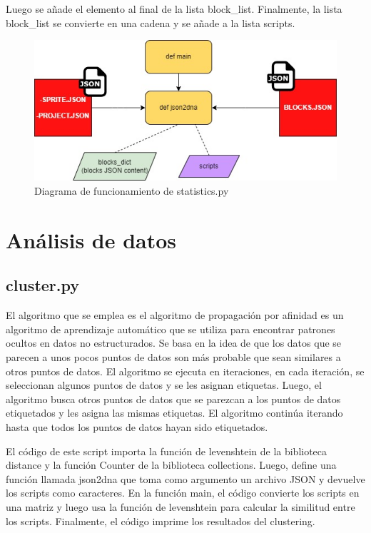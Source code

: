\documentclass[a4paper, 12pt]{book}
\begin{document}
Luego se añade el elemento al final de la lista block\_list. Finalmente, la lista block\_list se convierte en una cadena y se añade a la lista scripts. 

\begin{figure}[!htb]
  \centering
  \includegraphics[width=13cm, keepaspectratio]{img/flow_statistics.jpg}
  \caption{Diagrama de funcionamiento de statistics.py}
  \label{fig:flow_statistics}
\end{figure}

\section{Análisis de datos} 
\label{sec:extracciondatos}

\subsection{cluster.py}

El algoritmo que se emplea es el algoritmo de propagación por afinidad es un algoritmo de aprendizaje automático que se utiliza para encontrar patrones ocultos en datos no estructurados. Se basa en la idea de que los datos que se parecen a unos pocos puntos de datos son más probable que sean similares a otros puntos de datos. El algoritmo se ejecuta en iteraciones, en cada iteración, se seleccionan algunos puntos de datos y se les asignan etiquetas. Luego, el algoritmo busca otros puntos de datos que se parezcan a los puntos de datos etiquetados y les asigna las mismas etiquetas. El algoritmo continúa iterando hasta que todos los puntos de datos hayan sido etiquetados.

El código de este script importa la función de levenshtein de la biblioteca distance y la función Counter de la biblioteca collections. Luego, define una función llamada json2dna que toma como argumento un archivo JSON y devuelve los scripts como caracteres. En la función main, el código convierte los scripts en una matriz y luego usa la función de levenshtein para calcular la similitud entre los scripts. Finalmente, el código imprime los resultados del clustering.
\end{document}
